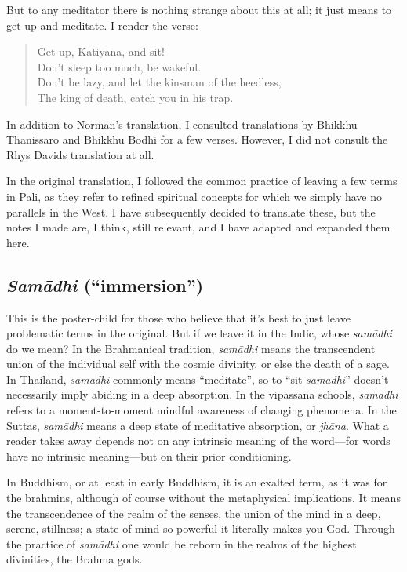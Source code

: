 \documentclass[12pt,openany]{book}%
\begin{document}
But to any meditator there is nothing strange about this at all; it just means to get up and meditate. I render the verse:

\begin{quotation}%
Get up, \textsanskrit{Kātiyāna}, and sit! \\
Don’t sleep too much, be wakeful. \\
Don’t be lazy, and let the kinsman of the heedless, \\
The king of death, catch you in his trap.

%
\end{quotation}

In addition to Norman’s translation, I consulted translations by Bhikkhu Thanissaro and Bhikkhu Bodhi for a few verses. However, I did not consult the Rhys Davids translation at all.

In the original translation, I followed the common practice of leaving a few terms in Pali, as they refer to refined spiritual concepts for which we simply have no parallels in the West. I have subsequently decided to translate these, but the notes I made are, I think, still relevant, and I have adapted and expanded them here.

\subsection*{\textit{\textsanskrit{Samādhi}} (“immersion”)}

This is the poster-child for those who believe that it’s best to just leave problematic terms in the original. But if we leave it in the Indic, whose \textit{\textsanskrit{samādhi}} do we mean? In the Brahmanical tradition, \textit{\textsanskrit{samādhi}} means the transcendent union of the individual self with the cosmic divinity, or else the death of a sage. In Thailand, \textit{\textsanskrit{samādhi}} commonly means “meditate”, so to “sit \textit{\textsanskrit{samādhi}}” doesn’t necessarily imply abiding in a deep absorption. In the vipassana schools, \textit{\textsanskrit{samādhi}} refers to a moment-to-moment mindful awareness of changing phenomena. In the Suttas, \textit{\textsanskrit{samādhi}} means a deep state of meditative absorption, or \textit{\textsanskrit{jhāna}}. What a reader takes away depends not on any intrinsic meaning of the word—for words have no intrinsic meaning—but on their prior conditioning.

In Buddhism, or at least in early Buddhism, it is an exalted term, as it was for the brahmins, although of course without the metaphysical implications. It means the transcendence of the realm of the senses, the union of the mind in a deep, serene, stillness; a state of mind so powerful it literally makes you God. Through the practice of \textit{\textsanskrit{samādhi}} one would be reborn in the realms of the highest divinities, the Brahma gods.
\end{document}
